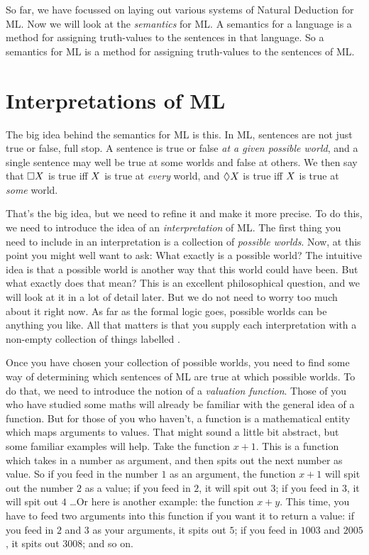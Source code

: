 So far, we have focussed on laying out various systems of Natural Deduction for ML. Now we will look at the \emph{semantics} for ML. A semantics for a language is a method for assigning truth-values to the sentences in that language. So a semantics for ML is a method for assigning truth-values to the sentences of ML.

\section{Interpretations of ML}

The big idea behind the semantics for ML is this. In ML, sentences are not just true or false, full stop. A sentence is true or false \emph{at a given possible world}, and a single sentence may well be true at some worlds and false at others. We then say that $\Box X$ is true iff $X$ is true at \emph{every} world, and $\Diamond X$ is true iff $X$ is true at \emph{some} world.

That's the big idea, but we need to refine it and make it more precise. To do this, we need to introduce the idea of an \emph{interpretation} of ML. The first thing you need to include in an interpretation is a collection of \emph{possible worlds}. Now, at this point you might well want to ask: What exactly is a possible world? The intuitive idea is that a possible world is another way that this world could have been. But what exactly does that mean? This is an excellent philosophical question, and we will look at it in a lot of detail later. But we do not need to worry too much about it right now. As far as the formal logic goes, possible worlds can be anything you like. All that matters is that you supply each interpretation with a non-empty collection of things labelled .

Once you have chosen your collection of possible worlds, you need to find some way of determining which sentences of ML are true at which possible worlds. To do that, we need to introduce the notion of a \emph{valuation function}. Those of you who have studied some maths will already be familiar with the general idea of a function. But for those of you who haven't, a function is a mathematical entity which maps arguments to values. That might sound a little bit abstract, but some familiar examples will help. Take the function $x+1$. This is a function which takes in a number as argument, and then spits out the next number as value. So if you feed in the number $1$ as an argument, the function $x+1$ will spit out the number $2$ as a value; if you feed in $2$, it will spit out $3$; if you feed in $3$, it will spit out $4$ \dots  Or here is another example: the function $x+y$. This time, you have to feed two arguments into this function if you want it to return a value: if you feed in $2$ and $3$ as your arguments, it spits out $5$; if you feed in $1003$ and $2005$, it spits out $3008$; and so on.

